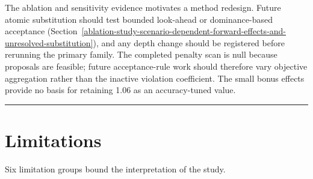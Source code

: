 \documentclass[applsci,article,submit,moreauthors]{Definitions/mdpi}
\begin{document}
The ablation and sensitivity evidence motivates a method redesign. Future atomic substitution should test bounded look-ahead or dominance-based acceptance (Section~\ref{ablation-study-scenario-dependent-forward-effects-and-unresolved-substitution}), and any depth change should be registered before rerunning the primary family. The completed penalty scan is null because proposals are feasible; future acceptance-rule work should therefore vary objective aggregation rather than the inactive violation coefficient. The small bonus effects provide no basis for retaining 1.06 as an accuracy-tuned value.

\begin{center}\rule{0.5\linewidth}{0.5pt}\end{center}

\section{Limitations}\label{limitations}

Six limitation groups bound the interpretation of the study.
\end{document}

